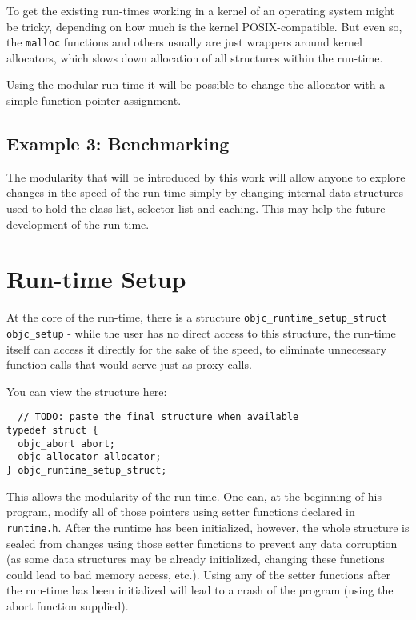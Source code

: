 To get the existing run-times working in a kernel of an operating system might be tricky, depending on how much is the kernel POSIX-compatible. But even so, the \verb=malloc= functions and others usually are just wrappers around kernel allocators, which slows down allocation of all structures within the run-time.

Using the modular run-time it will be possible to change the allocator with a simple function-pointer assignment.


\subsection{Example 3: Benchmarking}

The modularity that will be introduced by this work will allow anyone to explore changes in the speed of the run-time simply by changing internal data structures used to hold the class list, selector list and caching. This may help the future development of the run-time.


\section{Run-time Setup}

At the core of the run-time, there is a structure \verb=objc_runtime_setup_struct objc_setup= - while the user has no direct access to this structure, the run-time itself can access it directly for the sake of the speed, to eliminate unnecessary function calls that would serve just as proxy calls.

You can view the structure here:

\begin{verbatim}
  // TODO: paste the final structure when available
typedef struct {
  objc_abort abort;
  objc_allocator allocator;
} objc_runtime_setup_struct;
\end{verbatim}

This allows the modularity of the run-time. One can, at the beginning of his program, modify all of those pointers using setter functions declared in \verb=runtime.h=. After the runtime has been initialized, however, the whole structure is sealed from changes using those setter functions to prevent any data corruption (as some data structures may be already initialized, changing these functions could lead to bad memory access, etc.). Using any of the setter functions after the run-time has been initialized will lead to a crash of the program (using the abort function supplied).


